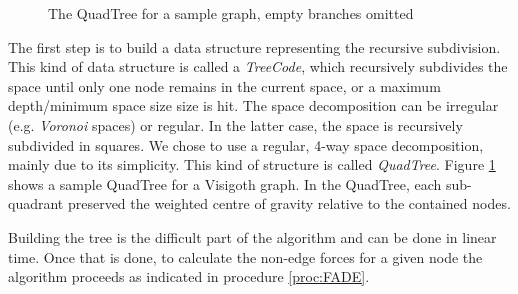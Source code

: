 \documentclass[a4paper,11pt,titlepage]{article}
\begin{document}
\begin{figure}
{\begin{tikzpicture}[y=0.80pt, x=0.8pt,yscale=-0.5, xscale=0.5, inner sep=0pt, outer sep=0pt]
    \end{tikzpicture}
  }
  \hspace{10pt}
  \caption{The QuadTree for a sample graph, empty branches omitted}
  \label{fig:quadtree}
\end{figure}

The first step is to build a data structure representing the recursive subdivision. This
kind of data structure is called a \emph{TreeCode}, which recursively subdivides the space
until only one node remains in the current space, or a maximum depth/minimum space size
size is hit. The space decomposition can be irregular (e.g. \emph{Voronoi} spaces) or
regular. In the latter case, the space is recursively subdivided in squares. We chose to
use a regular, 4-way space decomposition, mainly due to its simplicity. This kind of
structure is called \emph{QuadTree}. Figure \ref{fig:quadtree} shows a sample QuadTree for
a Visigoth graph. In the QuadTree, each sub-quadrant preserved the weighted centre of
gravity relative to the contained nodes.

Building the tree is the difficult part of the algorithm and can be done in linear time.
Once that is done, to calculate the non-edge forces for a given node the algorithm
proceeds as indicated in procedure \ref{proc:FADE}.
\end{document}

